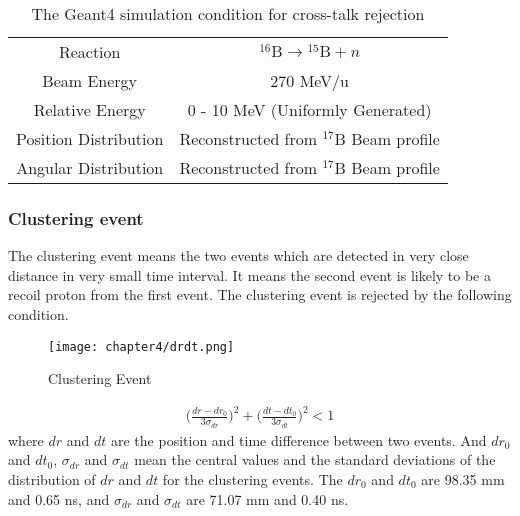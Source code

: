 \begin{table}
    \centering
    \begin{tabular}[h]{c|c}
        \hline 
        Reaction & ${}^{16}\text{B} \to {}^{15}\text{B}+n$ \\
        Beam Energy & 270 MeV/u\\
        Relative Energy & 0 - 10 MeV (Uniformly Generated)\\
        Position Distribution & Reconstructed from ${}^{17}$B Beam profile\\
        Angular Distribution & Reconstructed from ${}^{17}$B Beam profile \\
        \hline
    \end{tabular}
    \caption{The Geant4 simulation condition for cross-talk rejection}
    \label{tab:cross-talk_sim}
\end{table}

\subsubsection{Clustering event}
The clustering event means the two events which are detected in very close distance in very small time interval. It means the second event is likely to be a recoil proton from the first event. The clustering event is rejected by the following condition.

\begin{figure}[h]
    \centering
    \texttt{[image: chapter4/drdt.png]}
    \caption[Clustering Event]{Clustering Event}
    \label{fig:clustering}
\end{figure}

\begin{align}
    \bigg( \frac{dr-dr_0}{3\sigma_{dr}} \bigg)^2 + \bigg( \frac{dt-dt_0}{3\sigma_{dt}} \bigg)^2 < 1 
\end{align}
where $dr$ and $dt$ are the position and time difference between two events. And $dr_0$ and $dt_0$, $\sigma_{dr}$ and $\sigma_{dt}$ mean the central values and the standard deviations of the distribution of $dr$ and $dt$ for the clustering events. The $dr_0$ and $dt_0$ are 98.35 mm and 0.65 ns, and $\sigma_{dr}$ and $\sigma_{dt}$ are 71.07 mm and 0.40 ns. 

